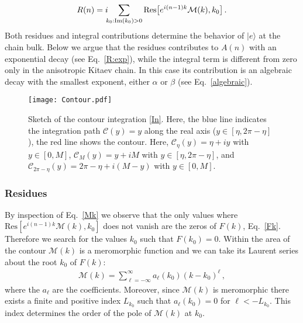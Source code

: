 \documentclass[pra,twocolumn,
superscriptaddress,
showpacs,
aps
]{revtex4-1}
\begin{document}
\begin{align}
R(n)=i\hspace{-0.15cm}\sum_{k_0:\mathrm{Im}(k_0)>0}\mathrm{Res}\big[e^{i(n-1)k}{\mathcal M}(k),k_0\big]\,.\label{Rn}
\end{align}
Both residues and integral contributions determine the behavior of $|e\rangle$ at the chain bulk. Below we argue that the residues contributes to $A(n)$ with an exponential decay (see Eq.~\eqref{R:exp}), while the integral term is different from zero only in the anisotropic Kitaev chain. In this case its contribution is an algebraic decay with the smallest exponent, either $\alpha$ or $\beta$ (see Eq.~\eqref{algebraic}). 

\begin{figure}[h!]
	\center \texttt{[image: Contour.pdf]}
	\caption{Sketch of the contour integration \eqref{In}. Here, the blue line indicates the integration path $\mathcal{C}(y)=y$ along the real axis ($y\in[\eta,2\pi-\eta]$), the red line shows the contour. Here, $\mathcal{C}_{\eta}(y)=\eta+iy$ with $y\in[0,M]$, $\mathcal{C}_{M}(y)=y+iM$ with $y\in[\eta,2\pi-\eta]$, and $\mathcal{C}_{2\pi-\eta}(y)=2\pi-\eta+i(M-y)$ with $y\in[0,M]$. \label{Fig:contour}}
\end{figure}

\subsubsection{Residues}

By inspection of Eq.~\eqref{Mk} we observe that the only values where $\mathrm{Res}[e^{i(n-1)k}{\mathcal M}(k),k_0]$ does not vanish are the zeros of $F(k)$, Eq.~\eqref{Fk}. Therefore we search for the values $k_0$ such that  $F(k_0)=0$. Within the area of the contour ${\mathcal M}(k)$ is a meromorphic function and we can take its Laurent series about the root $k_0$ of $F(k)$:
\begin{align}
{\mathcal M}(k)=\sum_{\ell=-\infty}^{\infty}a_{\ell}(k_0)(k-k_0)^{\ell}\,,\label{Laurent}
\end{align}
where the $a_{\ell}$ are the coefficients. Moreover, since  ${\mathcal M}(k)$ is meromorphic there exists a finite and positive index $L_{k_0}$ such that $a_{\ell}(k_0)=0$ for $\ell<-L_{k_0}$. This index determines  the order of the pole of ${\mathcal M}(k)$ at $k_0$.
\end{document}
